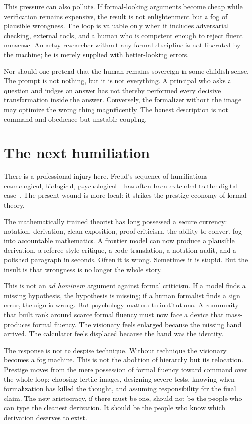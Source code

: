 \documentclass[
  aps,
  reprint,
  superscriptaddress,
  floatfix,
  nofootinbib,
  longbibliography
]{revtex4-2}
\begin{document}
This pressure can also pollute. If formal-looking arguments become cheap while
verification remains expensive, the result is not enlightenment but a fog of
plausible wrongness. The loop is valuable only when it includes adversarial
checking, external tools, and a human who is competent enough to reject fluent
nonsense. An artsy researcher without any formal discipline is not liberated by
the machine; he is merely supplied with better-looking errors.

Nor should one pretend that the human remains sovereign in some childish sense.
The prompt is not nothing, but it is not everything. A principal who asks a
question and judges an answer has not thereby performed every decisive
transformation inside the answer. Conversely, the formalizer without the image may
optimize the wrong thing magnificently. The honest description is not command and
obedience but unstable coupling.

\section{The next humiliation}

There is a professional injury here. Freud's sequence of humiliations---cosmological,
biological, psychological---has often been extended to the digital
case~\cite{freud1917,floridi2014}. The present wound is more local: it strikes
the prestige economy of formal theory.

The mathematically trained theorist has long possessed a secure currency:
notation, derivation, clean exposition, proof criticism, the ability to convert
fog into accountable mathematics. A frontier model can now produce a plausible
derivation, a referee-style critique, a code translation, a notation audit, and a
polished paragraph in seconds. Often it is wrong. Sometimes it is stupid. But the
insult is that wrongness is no longer the whole story.

This is not an \emph{ad hominem} argument against formal criticism. If a model
finds a missing hypothesis, the hypothesis is missing; if a human formalist finds
a sign error, the sign is wrong. But psychology matters to institutions. A
community that built rank around scarce formal fluency must now face a device
that mass-produces formal fluency. The visionary feels enlarged because the
missing hand arrived. The calculator feels displaced because the hand was the
identity.

The response is not to despise technique. Without technique the visionary becomes
a fog machine. This is not the abolition of hierarchy but its relocation.
Prestige moves from the mere possession of formal fluency toward command over the
whole loop: choosing fertile images, designing severe tests, knowing when
formalization has killed the thought, and assuming responsibility for the final
claim. The new aristocracy, if there must be one, should not be the people who
can type the cleanest derivation. It should be the people who know which
derivation deserves to exist.
\end{document}
